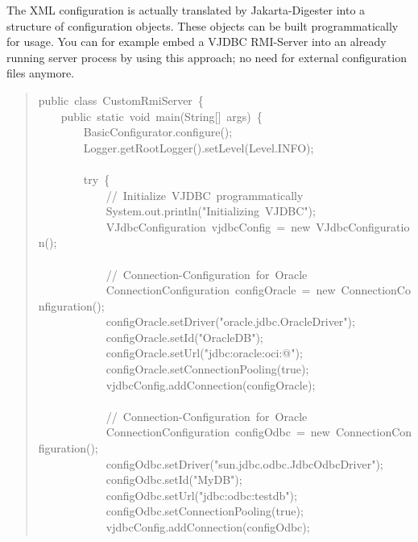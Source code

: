 \documentclass[10pt,a4paper,english]{article}
\begin{document}
The XML configuration is actually translated by Jakarta-Digester into a structure of configuration objects. These objects can be built programmatically for usage. You can for example embed a VJDBC RMI-Server into an already running server process by using this approach; no need for external configuration files anymore.
\begin{quote}{\ttfamily \raggedright \noindent
public~class~CustomRmiServer~{\{}~\\
~~~~public~static~void~main(String{[}]~args)~{\{}~\\
~~~~~~~~BasicConfigurator.configure();~\\
~~~~~~~~Logger.getRootLogger().setLevel(Level.INFO);~\\
~\\
~~~~~~~~try~{\{}~\\
~~~~~~~~~~~~//~Initialize~VJDBC~programmatically~\\
~~~~~~~~~~~~System.out.println("Initializing~VJDBC");~\\
~~~~~~~~~~~~VJdbcConfiguration~vjdbcConfig~=~new~VJdbcConfiguration();~\\
~\\
~~~~~~~~~~~~//~Connection-Configuration~for~Oracle~\\
~~~~~~~~~~~~ConnectionConfiguration~configOracle~=~new~ConnectionConfiguration();~\\
~~~~~~~~~~~~configOracle.setDriver("oracle.jdbc.OracleDriver");~\\
~~~~~~~~~~~~configOracle.setId("OracleDB");~\\
~~~~~~~~~~~~configOracle.setUrl("jdbc:oracle:oci:@");~\\
~~~~~~~~~~~~configOracle.setConnectionPooling(true);~\\
~~~~~~~~~~~~vjdbcConfig.addConnection(configOracle);~\\
~\\
~~~~~~~~~~~~//~Connection-Configuration~for~Oracle~\\
~~~~~~~~~~~~ConnectionConfiguration~configOdbc~=~new~ConnectionConfiguration();~\\
~~~~~~~~~~~~configOdbc.setDriver("sun.jdbc.odbc.JdbcOdbcDriver");~\\
~~~~~~~~~~~~configOdbc.setId("MyDB");~\\
~~~~~~~~~~~~configOdbc.setUrl("jdbc:odbc:testdb");~\\
~~~~~~~~~~~~configOdbc.setConnectionPooling(true);~\\
~~~~~~~~~~~~vjdbcConfig.addConnection(configOdbc);~\\
}
\end{quote}
\end{document}
